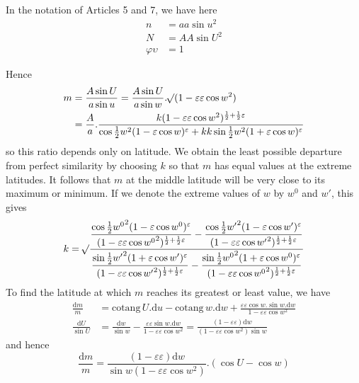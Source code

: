 In the notation of Articles 5 and 7, we have here
\[
\begin{aligned}
n&=aa\sin u^2\\
N&=AA\sin U^2\\
\varphi\upsilon&=1
\end{aligned}
\]
\par\indent Hence
\[
\begin{aligned}
m&=\frac{A\sin U}{a\sin u}=\frac{A\sin U}{a\sin w}\mathord{.}\mathord{{}^{}\!\surd}(1-\varepsilon\varepsilon\cos w^2)\\
&=\frac{A}{a}\mathord{.}\frac{k(1-\varepsilon\varepsilon\cos w^2)^{\frac{1}{2}+\frac{1}{2}\varepsilon}}{\cos\frac{1}{2}w^2(1-\varepsilon\cos w)^{\varepsilon}+kk\sin\frac{1}{2}w^2(1+\varepsilon\cos w)^{\varepsilon}}
\end{aligned}
\]
\noindent so this ratio depends only on latitude. We obtain the least possible departure from perfect similarity by choosing \(k\) so that \(m\) has equal values at the extreme latitudes. It follows that \(m\) at the middle latitude will be very close to its maximum or minimum. If we denote the extreme values of \(w\) by \(w^0\) and \(w'\), this gives
\[
k=\mathord{{}^{}\!\surd}\frac{\displaystyle\frac{\cos\frac{1}{2}{w^0}^{2}(1-\varepsilon\cos w^0)^{\varepsilon}}{(1-\varepsilon\varepsilon\cos {w^0}^{2})^{\frac{1}{2}+\frac{1}{2}\varepsilon}}-\frac{\cos\frac{1}{2}{w'}^{2}(1-\varepsilon\cos w')^{\varepsilon}}{(1-\varepsilon\varepsilon\cos {w'}^{2})^{\frac{1}{2}+\frac{1}{2}\varepsilon}}}{\displaystyle\frac{\sin\frac{1}{2}{w'}^{2}(1+\varepsilon\cos w')^{\varepsilon}}{(1-\varepsilon\varepsilon\cos {w'}^{2})^{\frac{1}{2}+\frac{1}{2}\varepsilon}}-\frac{\sin\frac{1}{2}{w^0}^{2}(1+\varepsilon\cos w^0)^{\varepsilon}}{(1-\varepsilon\varepsilon\cos {w^0}^{2})^{\frac{1}{2}+\frac{1}{2}\varepsilon}}}
\]
\noindent To find the latitude at which \(m\) reaches its greatest or least value, we have
%
\[
\begin{aligned}
\frac{\mathrm{d}m}{m}&=\mathrm{cotang}\,U\mathord{.}\mathrm{d}u-\mathrm{cotang}\,w\mathord{.}\mathrm{d}w+\frac{\varepsilon\varepsilon\cos w\mathord{.}\sin w\mathord{.}\mathrm{d}w}{1-\varepsilon\varepsilon\cos w^2}\\
\frac{\mathrm{d}U}{\sin U}&=\frac{\mathrm{d}w}{\sin w}-\frac{\varepsilon\varepsilon\sin w\mathord{.}\mathrm{d}w}{1-\varepsilon\varepsilon\cos w^2}=\frac{(1-\varepsilon\varepsilon)\mathrm{d}w}{(1-\varepsilon\varepsilon\cos w^2)\sin w}
\end{aligned}
\]
\noindent and hence
\[
\frac{\mathrm{d}m}{m}=\frac{(1-\varepsilon\varepsilon)\mathrm{d}w}{\sin w(1-\varepsilon\varepsilon\cos w^2)}\mathord{.}(\cos U-\cos w)
\]
